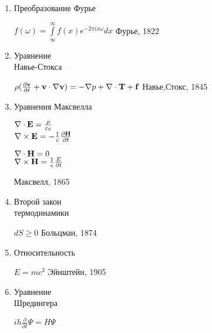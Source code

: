\documentclass[12pt]{article}
\begin{document}
\begin{k}
\begin{enumerate}
 \item Преобразование Фурье \hfill \begin{minipage}[t]{100mm} $f(\omega) = \int\limits_\infty ^\infty f(x)e^{-2\pi ix \omega}dx$  \hfill Фурье, 1822 \end{minipage}
 \item 
  \begin{minipage}[t]{45mm} Уравнение \\Навье-Стокса\\
  \end{minipage}
  \hfill
  \begin{minipage}[t]{100mm}$\rho(\frac{\partial {\bf v}}{\partial t}+{\bf v}\cdot\nabla{\bf v} ) = -\nabla p+\nabla\cdot{\bf T}+{\bf f}$ \hfill Навье,Стокс, 1845
  \end{minipage}
   \item Уравнения Максвелла \hfill \begin{minipage}[t]{100mm}  \begin{minipage}[t]{30mm}  $\nabla\cdot{\bf E} =   \frac{\rho}{\varepsilon_0}$ \\ $\nabla\times{\bf E} = -\frac{1}{c} \frac{\partial{\bf H}}{\partial t}$ \\ \end{minipage}
  \begin{minipage}[t]{30mm} $\nabla\cdot{\bf H} = 0$ \\$\nabla\times{\bf H} = \frac{1}{c} \frac {E}{\partial t}$ \\
   \end{minipage}  \hfill Максвелл, 1865\end{minipage}
   \item \begin{minipage}[t]{45mm} Второй закон \\термодинамики\\ \end{minipage}
  \hfill
 \begin{minipage}[t]{100mm}  $dS \ge 0$ \hfill Больцман, 1874 \end{minipage}
  \item Относительность \hfill \begin{minipage}[t]{100mm} $E = mc^2$ \hfill Эйнштейн, 1905
\end{minipage}
\item\begin{minipage}[t]{45mm} Уравнение \\Шредингера\\ \end{minipage}  \hfill \begin{minipage}[t]{100mm} $ih\frac{\partial}{\partial t}\Psi = H\Psi $

\end{minipage}
\end{enumerate}
\end{k}
\end{document}
